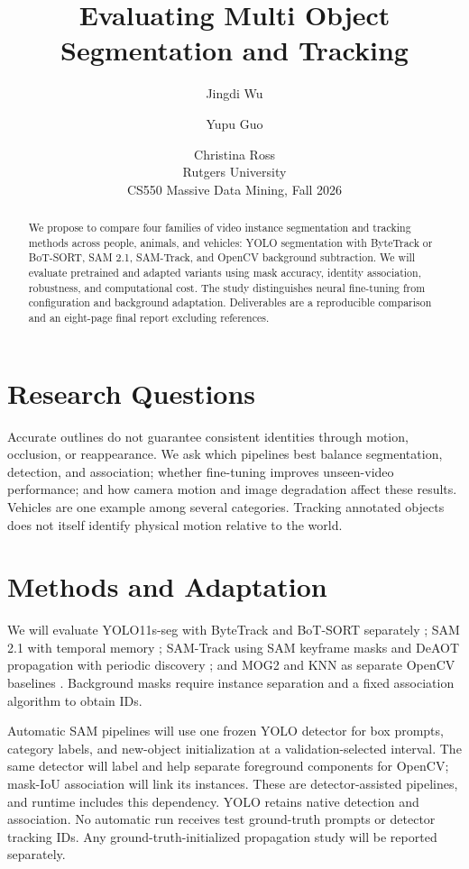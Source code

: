 \documentclass[11pt]{article}
\title{Evaluating Multi Object Segmentation and Tracking}
\author{Jingdi Wu \and Yupu Guo \and Christina Ross\\
{\normalfont Rutgers University}\\
{\normalfont CS550 Massive Data Mining, Fall 2026}}
\begin{document}
\maketitle


\begin{abstract}

We propose to compare four families of video instance segmentation and tracking methods across people, animals, and vehicles: YOLO segmentation with ByteTrack or BoT-SORT, SAM 2.1, SAM-Track, and OpenCV background subtraction. We will evaluate pretrained and adapted variants using mask accuracy, identity association, robustness, and computational cost. The study distinguishes neural fine-tuning from configuration and background adaptation. Deliverables are a reproducible comparison and an eight-page final report excluding references.

\end{abstract}

\section{Research Questions}

Accurate outlines do not guarantee consistent identities through motion, occlusion, or reappearance. We ask which pipelines best balance segmentation, detection, and association; whether fine-tuning improves unseen-video performance; and how camera motion and image degradation affect these results. Vehicles are one example among several categories. Tracking annotated objects does not itself identify physical motion relative to the world.

\section{Methods and Adaptation}

We will evaluate YOLO11s-seg with ByteTrack and BoT-SORT separately \citep{ultralytics2026}; SAM 2.1 with temporal memory \citep{meta2026}; SAM-Track using SAM keyframe masks and DeAOT propagation with periodic discovery \citep{cheng2023}; and MOG2 and KNN as separate OpenCV baselines \citep{opencv2026}. Background masks require instance separation and a fixed association algorithm to obtain IDs.

Automatic SAM pipelines will use one frozen YOLO detector for box prompts, category labels, and new-object initialization at a validation-selected interval. The same detector will label and help separate foreground components for OpenCV; mask-IoU association will link its instances. These are detector-assisted pipelines, and runtime includes this dependency. YOLO retains native detection and association. No automatic run receives test ground-truth prompts or detector tracking IDs. Any ground-truth-initialized propagation study will be reported separately.
\end{document}
